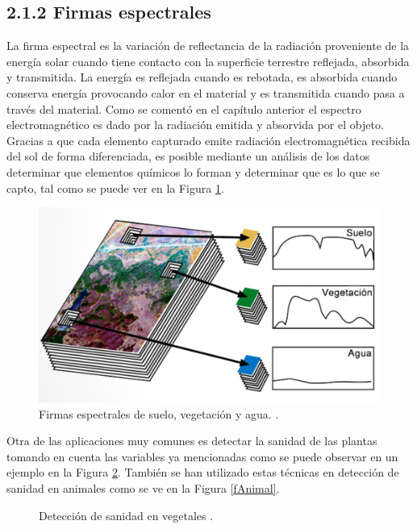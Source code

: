 \subsection{2.1.2 Firmas espectrales}
La firma espectral es la variación de reflectancia de la radiación proveniente de la energía solar cuando tiene contacto con la superficie terrestre reflejada, absorbida y transmitida. La energía es reflejada cuando es rebotada, es absorbida cuando conserva energía provocando calor en el material y es transmitida cuando pasa a través del material. Como se comentó en el capítulo anterior el espectro electromagnético es dado por la radiación emitida y absorvida por el objeto. Gracias a que cada elemento capturado emite radiación electromagnética recibida del sol de forma diferenciada, es posible mediante un análisis de los datos determinar que elementos químicos lo forman y determinar que es lo que se capto, tal como se puede ver en la Figura \ref{fFirma}.

\begin{figure}[h]
  \centering
  \includegraphics[width=.7\textwidth]{./images/firma.png}
  \centering
  \caption{Firmas espectrales de suelo, vegetación y agua. \cite{Quinones}.}
  \label{fFirma}
\end{figure}
Otra de las aplicaciones muy comunes es detectar la sanidad de las plantas tomando en cuenta las variables ya mencionadas como se puede observar en un ejemplo en la Figura \ref{fSanidad}. También se han utilizado estas técnicas en detección de sanidad en animales \cite{animal} como se ve en la Figura \ref{fAnimal}.

\begin{figure}[h]
  \centering
  \centering
  \caption{Detección de sanidad en vegetales \cite{chile}.}
  \label{fSanidad}
\end{figure}

